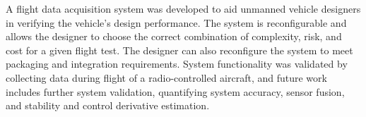 A flight data acquisition system was developed to aid unmanned vehicle designers in verifying the vehicle's design performance. The system is reconfigurable and allows the designer to choose the correct combination of complexity, risk, and cost for a given flight test. The designer can also reconfigure the system to meet packaging and integration requirements. System functionality was validated by collecting data during flight of a radio-controlled aircraft, and future work includes further system validation, quantifying system accuracy, sensor fusion, and stability and control derivative estimation.

